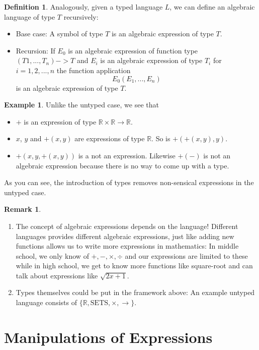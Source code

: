 \documentclass{amsart}
\theoremstyle{definition}
\newtheorem{defn}{Definition}
\newtheorem*{remark}{Remark}
\newtheorem*{example}{Example}
\newcommand{\R}{\mathbb{R}}
\begin{document}
\begin{defn}
Analogously, given a typed language $L$, we can define an algebraic language of type $T$ recursively:
\begin{itemize}
\item Base case: A symbol of type $T$ is an algebraic expression of type $T$.
\item Recursion: If $E_0$ is an algebraic expression of function type $(T1, ..., T_n) -> T$ and $E_i$ is an algebraic expression of type $T_i$ for $i = 1, 2, ..., n$ the function application $$E_0(E_1, ...,E_n)$$ is an algebraic expression of type $T$.
\end{itemize}
\end{defn}

\begin{example}
Unlike the untyped case, we see that
\begin{itemize}
\item $+$ is an expression of type $\R \times \R \rightarrow \R$.
\item $x$, $y$ and $+(x, y)$ are expressions of type $\R$. So is $+(+(x, y), y)$.
\item $+(x, y, +(x, y))$ is a not an expression. Likewise $+(-)$ is not an algebraic expression because there is no way to come up with a type.
\end{itemize}
As you can see, the introduction of types removes non-sensical expressions in the untyped case.
\end{example}

\begin{remark}
\begin{enumerate}
\item The concept of algebraic expressions depends on the language! Different languages provides different algebraic expressions, just like adding new functions allows us to write more expressions in mathematics: In middle school, we only know of $+, -, \times, \div$ and our expressions are limited to these while in high school, we get to know more functions like square-root and can talk about expressions like $\sqrt{2x + 1}$.

\item Types themselves could be put in the framework above: An example untyped language consists of $\{\R, \text{SETS}, \times, \rightarrow\}$.
\end{enumerate}
\end{remark}

\section{Manipulations of Expressions}
\end{document}

